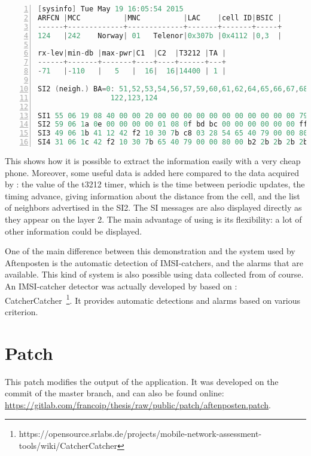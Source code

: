       \begin{lstlisting}[language=C, numbers=left,
        basicstyle=\footnotesize,
     frame=single, keepspaces=true]
[sysinfo] Tue May 19 16:05:54 2015
ARFCN |MCC          |MNC          |LAC    |cell ID|BSIC |
------+-------------+-------------+-------+-------+-----+
124   |242    Norway| 01   Telenor|0x307b |0x4112 |0,3  |

rx-lev|min-db |max-pwr|C1  |C2  |T3212 |TA |
------+-------+-------+----+----+------+---+
-71   |-110   |   5   |  16|  16|14400 | 1 |

SI2 (neigh.) BA=0: 51,52,53,54,56,57,59,60,61,62,64,65,66,67,68,76,81,
                 122,123,124

SI1 55 06 19 08 40 00 00 20 00 00 00 00 00 00 00 00 00 00 00 79 00 00 2b
SI2 59 06 1a 0e 00 00 00 00 01 08 0f bd bc 00 00 00 00 00 00 ff 79 00 00
SI3 49 06 1b 41 12 42 f2 10 30 7b c8 03 28 54 65 40 79 00 00 80 00 a0 43
SI4 31 06 1c 42 f2 10 30 7b 65 40 79 00 00 80 00 b2 2b 2b 2b 2b 2b 2b 2b
      \end{lstlisting}

    This shows how it is possible to extract the information easily with
    a very cheap phone. Moreover, some useful data is added here
    compared to the data acquired by : the value of
    the t3212 timer, which is the time between periodic updates, the
    timing advance, giving information about the distance from the cell, and
    the list of neighbors advertised in the SI2. The SI messages are
    also displayed directly as they appear on the layer 2. The main
    advantage of using  is its flexibility: a lot of
    other information could be displayed.

    One of the main difference between this demonstration and the system
    used by Aftenposten is the automatic detection of IMSI-catchers, and
    the alarms that are available. This kind of system is also possible
    using data collected from  of course. An
    IMSI-catcher detector was actually developed by  based
    on :
    CatcherCatcher~\footnote{https://opensource.srlabs.de/projects/mobile-network-assessment-tools/wiki/CatcherCatcher}.
    It provides automatic detections and alarms based on various
    criterion.

\newpage

    \section{Patch}

      This patch modifies the output of the 
      application. It was developed on the
       commit of the
      master branch, and can also be found online:
      \url{https://gitlab.com/francoip/thesis/raw/public/patch/aftenposten.patch}. \\


